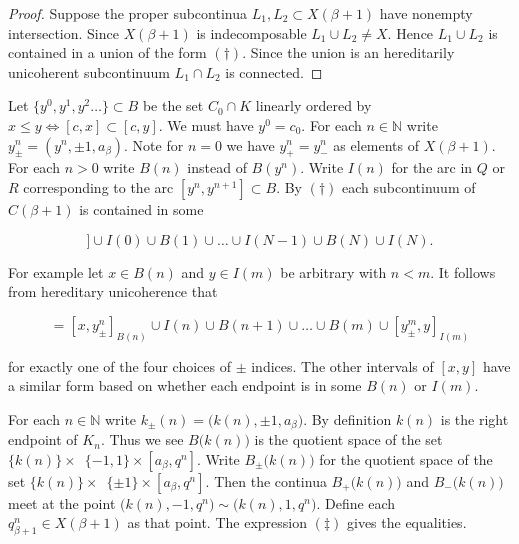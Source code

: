 \documentclass[12pt]{article}
\theoremstyle{plain}
\theoremstyle{definition}
\newcommand{\B}{\ensuremath{\beta}}
\newcommand{\NN}{\ensuremath{\mathbb N}}
\newcommand{\0}{\ensuremath{\varnothing}}
\begin{document}
	
	\begin{proof}
		Suppose the proper subcontinua $L_1,L_2 \subset X(\B+1)$ have nonempty intersection. Since $X(\B+1)$ is indecomposable $L_1 \cup L_2 \ne X$. Hence $L_1 \cup L_2$ is contained in a union of the form $(\dag)$.
		Since the union is an hereditarily unicoherent subcontinuum $L_1 \cap L_2$ is connected.
	\end{proof}
	
	Let $\{y^0,y^1,y^2 \ldots\} \subset B$ be the set $C_0 \cap K$ linearly ordered by $x\le y \iff [c,x] \subset [c,y]$.
	We must have $y^0=c_0$.
	For each $n \in \NN$ write $y^n_\pm = (y^n,\pm 1,a_\B)$.
	Note for $n=0$ we have $y^n_+ = y^n_- $ as elements of $X(\B+1)$.
	For each $n>0$ write $B(n)$ instead of $B(y^n)$.
	Write $I(n)$ for the arc in $Q$ or $R$ corresponding to the arc $[y^n,y^{n+1}] \subset B$.
	By $(\dag)$ each subcontinuum of $C(\B+1)$ is contained in some 
	
	\begin{equation}
	[[c_\B,a_\B]] \cup I(0) \cup B(1) \cup \ldots \cup I(N-1) \cup B({N}) \cup I(N). \tag{\dag \dag}
	\end{equation}
	
	For example let $x \in B(n)$ and $y \in I(m)$ be arbitrary with $n<m$.
	It follows from hereditary unicoherence that
	
	\begin{equation}
	[x,y] = [x,y^n_{\pm}]_{B(n)} \cup I(n) \cup B(n+1) \cup \ldots \cup B(m) \cup [y^m_{\pm}, y]_{I(m)}\tag{\ddag}
	\end{equation}
	
	for exactly one of the four choices of $\pm$ indices.
	The other intervals of $[x,y]$ have a similar form based on whether each endpoint is in some $B(n)$ or $I(m)$.
	
	For each $n \in \NN$ write $k_\pm (n)= \big (k(n),\pm 1,a_\B \big )$.
	By definition $k(n)$ is the right endpoint of $K_n$.
	Thus we see $B\big (k(n)\big )$ is the quotient space of the set \mbox{$\{k(n)\} \times$ $ \{-1,1\} \times  [a_\B,q^n]$}.
	Write $B_\pm \big (k(n) \big )$ for the quotient space of the set \mbox{$\{k(n)\} \times $ $\{\pm1\} \times [a_\B,q^n]$}.
	Then the continua $B_+ \big (k(n)\big )$ and $B_-\big (k(n)\big )$ meet at the point
	$\big (k(n),-1, q^n \big ) \sim \big (k(n),1, q^n \big )$.
	Define each $q^n_{\B+1} \in X(\B+1)$ as that point.
	The expression $(\ddag)$ gives the equalities.
	
	
	\vspace{3mm}
	
\end{document}

